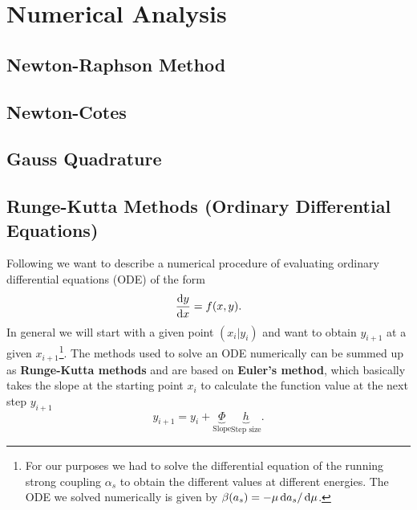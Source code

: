 		
	
		

		
		
\section{Numerical Analysis}
\cite{Chapra2010} \cite{Press2007}
\subsection{Newton-Raphson Method}
\subsection{Newton-Cotes}
\subsection{Gauss Quadrature}
\subsection{Runge-Kutta Methods (Ordinary Differential Equations)}
Following \cite{Chapra2015} we want to describe a numerical procedure of evaluating ordinary differential equations (ODE) of the form
\begin{equation}
	\frac{\mathop{}\!\mathrm{d} y}{\mathop{}\!\mathrm{d} x} = f(x,y).
\end{equation}
In general we will start with a given point $(x_i | y_i)$ and want to obtain $y_{i+1}$ at a given $x_{i+1}$\footnote{For our purposes we had to solve the differential equation of the running strong coupling $\alpha_s$ to obtain the different values at different energies. The ODE we solved numerically is given by $\beta(a_s) = - \mu \mathop{}\!\mathrm{d} a_s / \mathop{}\!\mathrm{d} \mu$.}. The methods used to solve an ODE numerically can be summed up as \textbf{Runge-Kutta methods} and are based on \textbf{Euler's method}, which basically takes the slope at the starting point $x_i$ to calculate the function value at the next step $y_{i+1}$
\begin{equation}
	y_{i+1} = y_i + \underbrace{\Phi}_{\text{Slope}} \underbrace{h}_{\text{Step size}}.
\end{equation}
